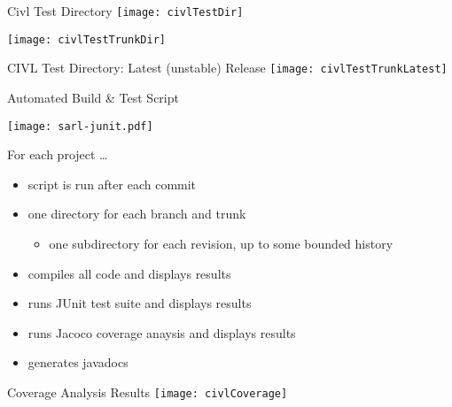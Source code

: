 \documentclass[t]{beamer}
\begin{document}
\begin{frame}{Civl Test Directory}
  \texttt{[image: civlTestDir]}
  
  \texttt{[image: civlTestTrunkDir]}
\end{frame}

\begin{frame}{CIVL Test Directory: Latest (unstable) Release}
  \texttt{[image: civlTestTrunkLatest]}
\end{frame}


\begin{frame}{Automated Build \& Test Script}

  \begin{center}
    \texttt{[image: sarl-junit.pdf]}
  \end{center}

  For each project \ldots
  \begin{itemize}
  \item script is run after each commit
  \item one directory for each \alert{branch} and \alert{trunk}
    \begin{itemize}
    \item one subdirectory for each revision, up to some bounded history
    \end{itemize}
  \item compiles all code and displays results
  \item runs JUnit test suite and displays results
  \item runs Jacoco coverage anaysis and displays results
  \item generates javadocs
  \end{itemize}
\end{frame}

\begin{frame}{Coverage Analysis Results}
  \texttt{[image: civlCoverage]}
\end{frame}
\end{document}
